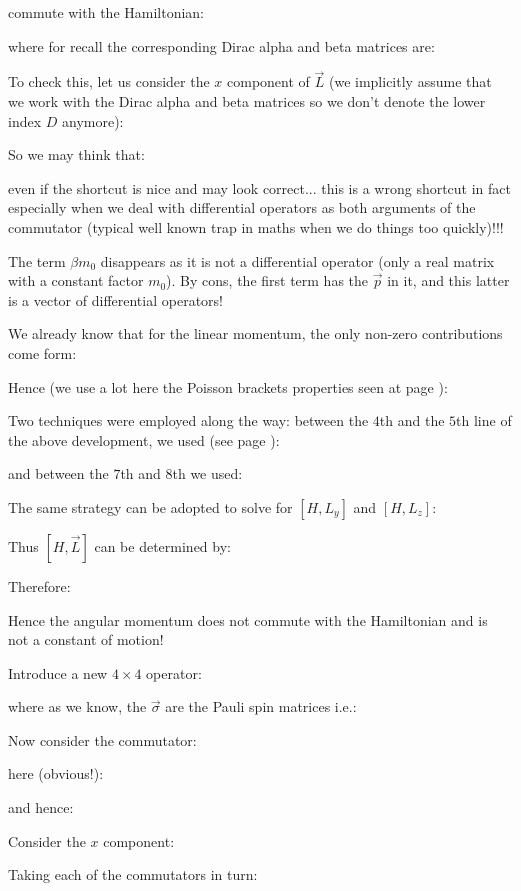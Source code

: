 	commute with the Hamiltonian:
	
	where for recall the corresponding Dirac alpha and beta matrices are:
	
	To check this, let us consider the $x$ component of $\vec{L}$ (we implicitly assume that we work with the Dirac alpha and beta matrices so we don't denote the lower index $D$ anymore):
	
	So we may think that:
	
	even if the shortcut is nice and may look correct... this is a wrong shortcut in fact especially when we deal with differential operators as both arguments of the commutator (typical well known trap in maths when we do things too quickly)!!!
	\begin{tcolorbox}[title=Remark,colframe=black,arc=10pt]
	The term $\beta m_0$ disappears as it is not a differential operator (only a real matrix with a constant factor $m_0$). By cons, the first term has the $\vec{p}$ in it, and this latter is a vector of differential operators!
	\end{tcolorbox}
	
	We already know that for the linear momentum, the only non-zero contributions come form:
	
	Hence (we use a lot here the Poisson brackets properties seen at page \pageref{poisson bracket}):
	
	Two techniques were employed along the way: between the $4$th and the $5$th line of the above development, we used (see page \pageref{poisson bracket}):
	
	and between the $7$th and $8$th we used:
	
	The same strategy can be adopted to solve for $[H,L_y]$ and $[H,L_z]$:
	
	Thus $[H,\vec{L}]$ can be determined by:
	
	Therefore:
	
	Hence the angular momentum does not commute with the Hamiltonian and is not a constant of motion!
	
	Introduce a new $4\times 4$ operator:
	
	where as we know, the $\vec{\sigma}$ are the Pauli spin matrices i.e.:
	
	Now consider the commutator:
	
	here (obvious!):
	
	and hence:
	
	Consider the $x$ component:
	
	Taking each of the commutators in turn:
	
